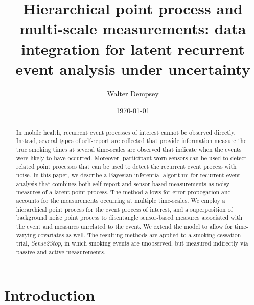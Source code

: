 \documentclass[11pt]{amsart}
\begin{document}
\title[Hierarchical point processes and multi-scale measurements]{Hierarchical point process and multi-scale measurements: data integration for latent recurrent event analysis under uncertainty}
\author{Walter Dempsey}
\address {Department of Statistics,
  Harvard University, One Oxford Street
   Cambridge, MA  02138, USA}

\date{\today}

\begin{abstract}
In mobile health, recurrent event processes of interest cannot be observed
directly. Instead, several types of self-report are collected that provide information measure the true smoking times at several time-scales are observed
that indicate when the events were likely to have occurred. Moreover, participant worn sensors can be used to detect related point processes that can be used to detect the recurrent event process with noise. In this paper, we describe a Bayesian inferential algorithm for recurrent event analysis that combines both self-report and sensor-based measurements as noisy measures of a latent point process.  The method allows for error propogation and accounts for the measurements occurring at multiple time-scales. We employ a hierarchical point process for the event process of interest, and a superposition of background noise point process to disentangle sensor-based measures associated with the event and measures unrelated to the event.  We extend the model to allow for time-varying covariates as well. The resulting methods are applied to a smoking cessation trial, \emph{Sense2Stop}, in which smoking events are unobserved, but measured indirectly via passive and active measurements.
\end{abstract}



\maketitle

\section{Introduction}
\label{section:introduction}
\end{document}
